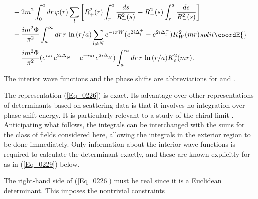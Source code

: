 \documentclass[a4paper,twocolumn,showpacs,preprintnumbers,amsmath,amssymb]{revtex4}
\begin{document}
\begin{widetext}
\begin{equation}
{\begin{split}
  &+ 2 m^2 \int^a_0 dr \, \varphi(r)
  \sum_l
  \left[
  R^2_{+}(r) \int^a_r \frac{ds}{R^2_{+}(s)}
  - R^2_{-}(s) \int^a_r \frac{ds}{R^2_{-}(s)}
  \right]\\
  &+ \frac{i m^2 \Phi}{\pi^2} \int^{\infty}_a dr \, r \,
  \ln \, (r/a)
  \sum_{l \neq N}
  e^{-i\pi W}(e^{2i\Delta^{+}_l} - e^{2i \Delta^{-}_l})
  K^2_W(mr)\\
  &+ \frac{im^2 \Phi}{\pi^2} (e^{i\pi\epsilon}
  e^{2i\Delta^{+}_N} - e^{- i\pi\epsilon}e^{2i\Delta^{-}_N})
  \int^{\infty}_a dr \, r \,
  \ln \, (r/a) K^2_{\epsilon}(mr).
\end{split}
}{split}\coordE{}\end{equation}
\end{widetext}


\noindent
The interior wave functions \coordHE{} and the phase shifts
\coordHE{} are abbreviations for \coordHE{}
and \coordHE{}.

The representation (\ref{Eq_0226}) is exact. Its advantage over other
representations of determinants based on scattering data is that it
involves no integration over phase shift energy. It is particularly
relevant to a study of the chiral limit \coordHE{}. Anticipating what follows,
the integrals can be interchanged with the sums for the class of fields
considered here, allowing the integrals in the exterior region \coordHE{}
to be done immediately. Only information about the interior wave
functions is required to calculate the determinant exactly, and these
are known explicitly for \coordHE{} as in (\ref{Eq_0229}) below.

The right-hand side of (\ref{Eq_0226}) must be real since it is a
Euclidean determinant. This imposes the nontrivial constraints
\end{document}
